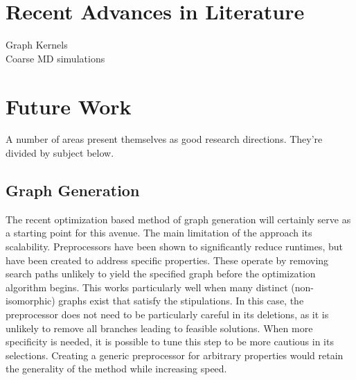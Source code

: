 \documentclass[11pt]{article}
\begin{document}
\section{Recent Advances in Literature}
Graph Kernels\\
Coarse MD simulations\\
\section{Future Work}
A number of areas present themselves as good research directions. They're divided by subject below.
\subsection{Graph Generation}
The recent optimization based method of graph generation will certainly serve as a starting point for this avenue. The main limitation of the approach its scalability. Preprocessors have been shown to significantly reduce runtimes, but have been created to address specific properties. These operate by removing search paths unlikely to yield the specified graph before the optimization algorithm begins. This works particularly well when many distinct (non-isomorphic) graphs exist that satisfy the stipulations. In this case, the preprocessor does not need to be particularly careful in its deletions, as it is unlikely to remove all branches leading to feasible solutions. When more specificity is needed, it is possible to tune this step to be more cautious in its selections. Creating a generic preprocessor for arbitrary properties would retain the generality of the method while increasing speed. \\
\end{document}
